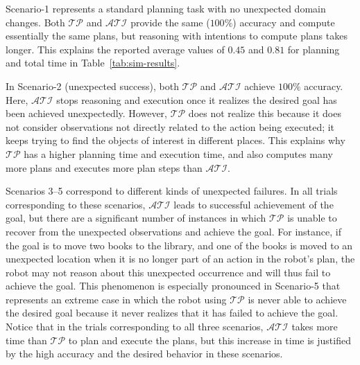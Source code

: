 \documentclass[letterpaper, 10 pt, conference]{article}  %
\begin{document}
Scenario-1 represents a standard planning task with no unexpected
domain changes. Both $\mathcal{TP}$ and $\mathcal{ATI}$ provide the
same ($100\%$) accuracy and compute essentially the same plans, but
reasoning with intentions to compute plans takes longer. This explains
the reported average values of $0.45$ and $0.81$ for planning and
total time in Table~\ref{tab:sim-results}.

In Scenario-2 (unexpected success), both $\mathcal{TP}$ and
$\mathcal{ATI}$ achieve $100\%$ accuracy. Here, $\mathcal{ATI}$ stops
reasoning and execution once it realizes the desired goal has been
achieved unexpectedly. However, $\mathcal{TP}$ does not realize this
because it does not consider observations not directly related to the
action being executed; it keeps trying to find the objects of interest
in different places. This explains why $\mathcal{TP}$ has a higher
planning time and execution time, and also computes many more plans
and executes more plan steps than $\mathcal{ATI}$.

Scenarios 3--5 correspond to different kinds of unexpected failures.
In all trials corresponding to these scenarios, $\mathcal{ATI}$ leads
to successful achievement of the goal, but there are a significant
number of instances in which $\mathcal{TP}$ is unable to recover from
the unexpected observations and achieve the goal. For instance, if the
goal is to move two books to the library, and one of the books is
moved to an unexpected location when it is no longer part of an action
in the robot's plan, the robot may not reason about this unexpected
occurrence and will thus fail to achieve the goal. This phenomenon is
especially pronounced in Scenario-5 that represents an extreme case in
which the robot using $\mathcal{TP}$ is never able to achieve the
desired goal because it never realizes that it has failed to achieve
the goal. Notice that in the trials corresponding to all three
scenarios, $\mathcal{ATI}$ takes more time than $\mathcal{TP}$ to plan
and execute the plans, but this increase in time is justified by the
high accuracy and the desired behavior in these scenarios.
\end{document}
